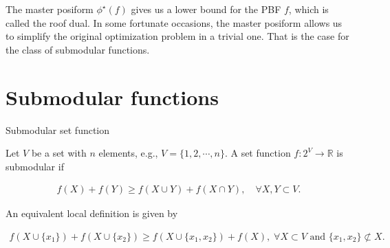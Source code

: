 The master posiform $\phi^{\star}(f)$ gives us a lower bound for the PBF $f$, which is called the roof dual. In some fortunate occasions, the master posiform allows us to simplify the original optimization problem in a trivial one. That is the case for the class of submodular functions.

\section{Submodular functions}

\begin{definition}{Submodular set function}

Let $V$ be a set with $n$ elements, e.g., $V=\{1,2,\cdots, n\}$. A set function $f:2^V\rightarrow \mathbb{R}$ is submodular if 

\begin{align}
	f(X) + f(Y) \geq f(X \cup Y) + f(X \cap Y),\quad \forall X,Y \subset V.
	\label{ch2:eq:submodular-set-function}
\end{align}

\end{definition}

An equivalent local definition is given by

\begin{align}
	f(X \cup \{x_1\}) + f(X \cup \{x_2\}) \geq f(X \cup \{x_1,x_2\}) + f(X), \; \forall X \subset V \text{ and } \{x_1,x_2\} \not\subset X.
	\label{ch2:eq:submodular-local}
\end{align}


